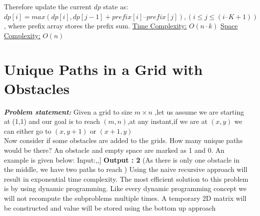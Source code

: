 \documentclass[12pt]{book}
\begin{document}
Therefore update the current $dp$ state as:\newline$dp[i] = max (dp[i], dp[j -1] + prefix[i] – prefix [j]), (i \leq j \leq (i – K + 1))$\newline, where prefix array stores the prefix sum.\newline\newline
\underline{Time Complexity:} $O(n \cdot k)$\newline\newline
\underline{Space Complexity:} $O(n)$\newline\newline

\chapter{Unique Paths in a Grid with Obstacles}

\textbf{\textit{Problem statement:}}\newline
Given a grid to size $m\times n$ ,let us assume we are starting at (1,1) and our goal is to reach $(m, n)$,at any instant,if we are at $(x,y)$ we can either go to $(x,y+1)$ or $(x+1,y)$\\

Now consider if some obstacles are added to the grids. How many unique paths would be there?\newline
An obstacle and empty space are marked as 1 and 0.
\newline
\newline
An example is given below:\newline
Input:\newline
[[0,0,0],\newline
[0,1,0],\newline
[0,0,0]]\newline
\newline
\textbf{Output : 2}\newline
(As there is only one obstacle in the middle, we have two paths to reach )\newline
Using the naive recursive approach will result in exponential time complexity.\newline
\newline
The most efficient solution to this problem is by using dynamic programming. Like every dynamic programming concept we will not recompute the subproblems multiple times. A temporary 2D matrix will be constructed and value will be stored using the bottom up approach\\
\end{document}
